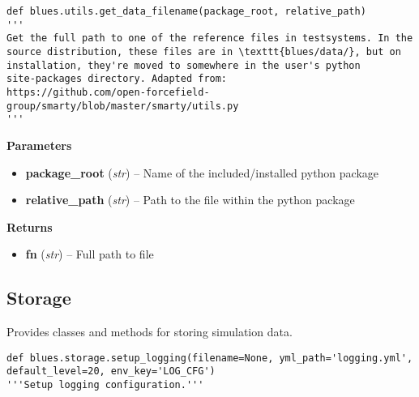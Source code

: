 \begin{description}
\begin{verbatim}
def blues.utils.get_data_filename(package_root, relative_path)
'''
Get the full path to one of the reference files in testsystems. In the
source distribution, these files are in \texttt{blues/data/}, but on
installation, they're moved to somewhere in the user's python
site-packages directory. Adapted from:
https://github.com/open-forcefield-group/smarty/blob/master/smarty/utils.py
'''
\end{verbatim}

\begin{description}
\item
    \textbf{Parameters}
\begin{itemize}
\item
  \textbf{package\_root} (\emph{str}) -- Name of the included/installed
  python package
\item
  \textbf{relative\_path} (\emph{str}) -- Path to the file within the
  python package
\end{itemize}
\item
    \textbf{Returns}
\begin{itemize}
    \item
        \textbf{fn} (\emph{str}) -- Full path to file
\end{itemize}
\end{description}
\end{description}


\hypertarget{storage}{%
\subsection{Storage}\label{storage}}
Provides classes and methods for storing simulation data.


\begin{description}
\begin{verbatim}
def blues.storage.setup_logging(filename=None, yml_path='logging.yml', default_level=20, env_key='LOG_CFG')
'''Setup logging configuration.'''
\end{verbatim}
\end{description}

